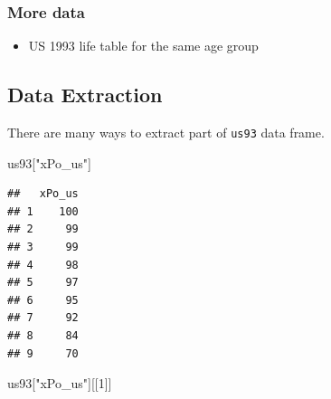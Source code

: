 \documentclass[
]{article}
\newenvironment{Shaded}{\begin{snugshade}}{\end{snugshade}}
\newcommand{\AttributeTok}[1]{\textcolor[rgb]{0.77,0.63,0.00}{#1}}
\newcommand{\DecValTok}[1]{\textcolor[rgb]{0.00,0.00,0.81}{#1}}
\newcommand{\FunctionTok}[1]{\textcolor[rgb]{0.00,0.00,0.00}{#1}}
\newcommand{\NormalTok}[1]{#1}
\newcommand{\OtherTok}[1]{\textcolor[rgb]{0.56,0.35,0.01}{#1}}
\newcommand{\SpecialCharTok}[1]{\textcolor[rgb]{0.00,0.00,0.00}{#1}}
\newcommand{\StringTok}[1]{\textcolor[rgb]{0.31,0.60,0.02}{#1}}
\providecommand{\tightlist}{%
  \setlength{\itemsep}{0pt}\setlength{\parskip}{0pt}}
\begin{document}
\hypertarget{more-data}{%
\subsubsection{More data}\label{more-data}}

\begin{itemize}
\tightlist
\item
  US 1993 life table for the same age group
\end{itemize}

\begin{Shaded}
\end{Shaded}

\hypertarget{data-extraction}{%
\subsection{Data Extraction}\label{data-extraction}}

There are many ways to extract part of \texttt{us93} data frame.

\begin{Shaded}
\begin{Highlighting}[]
\NormalTok{us93[}\StringTok{"xPo\_us"}\NormalTok{]}
\end{Highlighting}
\end{Shaded}

\begin{verbatim}
##   xPo_us
## 1    100
## 2     99
## 3     99
## 4     98
## 5     97
## 6     95
## 7     92
## 8     84
## 9     70
\end{verbatim}

\begin{Shaded}
\begin{Highlighting}[]
\NormalTok{us93[}\StringTok{"xPo\_us"}\NormalTok{][[}\DecValTok{1}\NormalTok{]]}
\end{Highlighting}
\end{Shaded}
\end{document}
